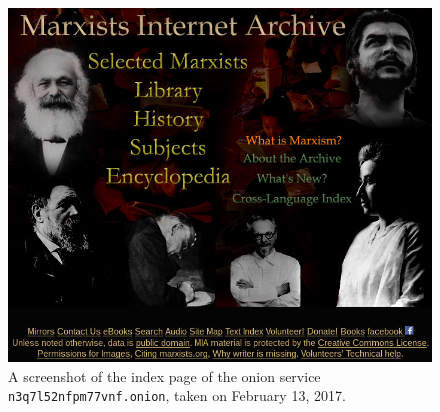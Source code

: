 \begin{figure}[t]
	\centering
	\includegraphics[width=\linewidth]{figures/marxists-internet-archive.jpg}
	\caption{A screenshot of the index page of the onion service
		\texttt{n3q7l52nfpm77vnf.onion}, taken on February 13, 2017.}
	\label{fig:archive}
\end{figure}
